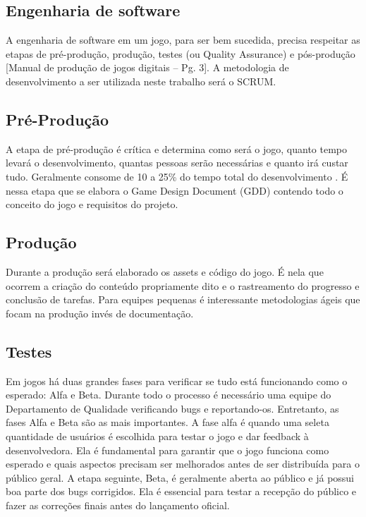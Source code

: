 \documentclass[12pt, 
openright, 
oneside, 
a4paper,    
brazil]{facom-ufu-abntex2}
\begin{document}
\subsection{Engenharia de software}
A engenharia de software em um jogo, para ser bem sucedida, precisa respeitar as etapas de pré-produção, produção, testes (ou Quality Assurance) e pós-produção [Manual de produção de jogos digitais – Pg. 3]. A metodologia de desenvolvimento a ser utilizada neste trabalho será o SCRUM.

\subsection{Pré-Produção}
A etapa de pré-produção é crítica e determina como será o jogo, quanto tempo levará o desenvolvimento, quantas pessoas serão necessárias e quanto irá custar tudo. Geralmente consome de 10 a 25\% do tempo total do desenvolvimento \cite{Manualdejogosdigitais}. É nessa etapa que se elabora o Game Design Document (GDD) contendo todo o conceito do jogo e requisitos do projeto.

\subsection{Produção}
Durante a produção será elaborado os assets e código do jogo. É nela que ocorrem a criação do conteúdo propriamente dito e o rastreamento do progresso e conclusão de tarefas\cite{Manualdejogosdigitais}. Para equipes pequenas é interessante metodologias ágeis que focam na produção invés de documentação.

\subsection{Testes}
Em jogos há duas grandes fases para verificar se tudo está funcionando como o esperado: Alfa e Beta. Durante todo o processo é necessário uma equipe do Departamento de Qualidade verificando bugs e reportando-os. Entretanto, as fases Alfa e Beta são as mais importantes. A fase alfa é quando uma seleta quantidade de usuários é escolhida para testar o jogo e dar feedback à desenvolvedora. Ela é fundamental para garantir que o jogo funciona como esperado e quais aspectos precisam ser melhorados antes de ser distribuída para o público geral. A etapa seguinte, Beta, é geralmente aberta ao público e já possui boa parte dos bugs corrigidos. Ela é essencial para testar a recepção do público e fazer as correções finais antes do lançamento oficial.
\end{document}
